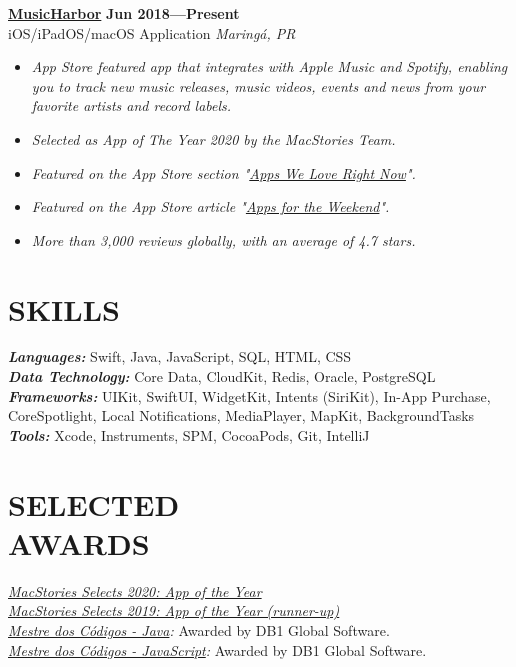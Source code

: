 \documentclass[line,margin]{res}
\begin{document}
\begin{resume}
  {\bf \href{https://apps.apple.com/us/app/musicharbor/id1440405750}{MusicHarbor}} \hfill {\bf Jun 2018---Present} \\
  iOS/iPadOS/macOS Application \hfill {\sl Maring\'a, PR}\\[-6pt]
    \begin{itemize}
    \item {\sl App Store featured app that integrates with Apple Music and Spotify, enabling you to track new music releases, music videos, events and news from your favorite artists and record labels.}
    \item {\sl Selected as App of The Year 2020 by the MacStories Team.}
    \item {\sl Featured on the App Store section "\href{https://github.com/marcosatanaka/resume-latex/blob/master/images/apps_we_love_right_now.png?raw=true}{Apps We Love Right Now}".}
    \item {\sl Featured on the App Store article "\href{https://apps.apple.com/us/story/id1516537723}{Apps for the Weekend}".}
    \item {\sl More than 3,000 reviews globally,  with an average of 4.7 stars.}
    \end{itemize}


\section{SKILLS}
  {\sl {\bf Languages:}} Swift, Java, JavaScript, SQL, HTML, CSS \\
  {\sl {\bf Data Technology:}} Core Data, CloudKit, Redis, Oracle, PostgreSQL \\
  {\sl {\bf Frameworks:}} UIKit, SwiftUI, WidgetKit, Intents (SiriKit), In-App Purchase, CoreSpotlight, Local Notifications, MediaPlayer, MapKit, BackgroundTasks \\
  {\sl {\bf Tools:}} Xcode, Instruments, SPM, CocoaPods, Git, IntelliJ


\section{SELECTED \\ AWARDS}             
  {\sl \href{https://www.macstories.net/stories/macstories-selects-2020-recognizing-the-best-apps-of-the-year/#app-of-the-year}{MacStories Selects 2020: App of the Year}}\\
  {\sl \href{https://www.macstories.net/stories/macstories-selects-2019-recognizing-the-best-apps-of-the-year/#app-of-the-year-runner-up}{MacStories Selects 2019: App of the Year (runner-up)}}\\
  {\sl \href{https://mestredoscodigos.com.br/primeira-entrega-dos-pins-do-mestre-dos-codigos}{Mestre dos C\'odigos - Java}:} Awarded by DB1 Global Software.\\
  {\sl \href{https://mestredoscodigos.com.br/primeira-entrega-dos-pins-do-mestre-dos-codigos}{Mestre dos C\'odigos - JavaScript}:} Awarded by DB1 Global Software.\\
 

\end{resume}
\end{document}
